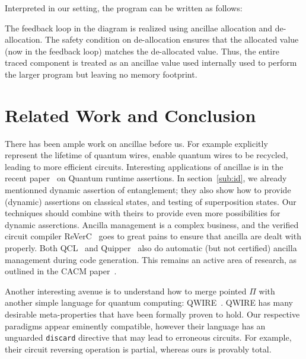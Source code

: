\documentclass[sigplan,10pt,review,anonymous]{acmart}
\begin{document}
Interpreted in our setting, the program can be written as follows:

\PPFTtraceex{}

The feedback loop in the diagram is realized using ancillae allocation
and de-allocation. The safety condition on de-allocation ensures that
the allocated value (now in the feedback loop) matches the
de-allocated value. Thus, the entire traced component is treated as an
ancillae value used internally used to perform the larger program but
leaving no memory footprint. 


\section{Related Work and Conclusion}

There has been ample work on ancillae before us.  For example%
\cite{PhysRevA.94.042337} explicitly represent the lifetime of
quantum wires, enable quantum wires to be recycled, leading
to more efficient circuits.  Interesting applications of
ancillae is in the recent paper~\cite{DBLP:journals/cal/ZhouB19}
on Quantum runtime assertions.  In section~\ref{sub:id}, we
already mentionned dynamic assertion of entanglement; they
also show how to provide (dynamic) assertions on classical
states, and testing of superposition states.  Our techniques
should combine with theirs to provide even more possibilities
for dynamic asserctions. Ancilla management is a complex
business, and the verified circuit compiler
ReVerC~\cite{amy2017verified} goes to great pains to
ensure that ancilla are dealt with properly.  Both
QCL~\cite{omer2002procedural} and Quipper~\cite{Green:2013:QSQ:2491956.2462177}
also do automatic (but not certified) ancilla management during code
generation.  This remains an active area of research, as
outlined in the CACM paper~\cite{valiron2015programming}.

Another interesting avenue is to understand how to merge 
pointed $\Pi$ with another simple language for quantum
computing: QWIRE~\cite{Paykin:2017:QCL:3009837.3009894}.
QWIRE has many desirable meta-properties that have been
formally proven to hold.  Our respective paradigms appear eminently compatible,
however their language has an unguarded \texttt{discard} directive that
may lead to erroneous circuits. For example, their circuit
reversing operation is partial, whereas ours is provably total.
\end{document}
